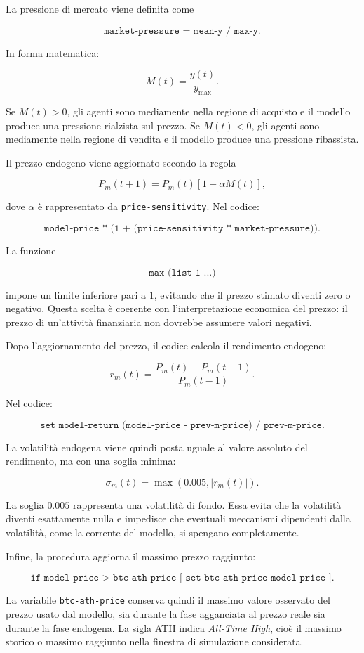 La pressione di mercato viene definita come

\[
\texttt{market-pressure = mean-y / max-y}.
\]

In forma matematica:

\[
M(t)=\frac{\bar{y}(t)}{y_{\max}}.
\]

Se \(M(t)>0\), gli agenti sono mediamente nella regione di acquisto e il modello
produce una pressione rialzista sul prezzo. Se \(M(t)<0\), gli agenti sono
mediamente nella regione di vendita e il modello produce una pressione ribassista.

Il prezzo endogeno viene aggiornato secondo la regola

\[
P_m(t+1)
=
P_m(t)
\left[
1+\alpha M(t)
\right],
\]

dove \(\alpha\) è rappresentato da \texttt{price-sensitivity}. Nel codice:

\[
\texttt{model-price * (1 + (price-sensitivity * market-pressure))}.
\]

La funzione

\[
\texttt{max (list 1 ...)}
\]

impone un limite inferiore pari a \(1\), evitando che il prezzo stimato diventi
zero o negativo. Questa scelta è coerente con l'interpretazione economica del
prezzo: il prezzo di un'attività finanziaria non dovrebbe assumere valori
negativi.

Dopo l'aggiornamento del prezzo, il codice calcola il rendimento endogeno:

\[
r_m(t)=\frac{P_m(t)-P_m(t-1)}{P_m(t-1)}.
\]

Nel codice:

\[
\texttt{set model-return (model-price - prev-m-price) / prev-m-price}.
\]

La volatilità endogena viene quindi posta uguale al valore assoluto del
rendimento, ma con una soglia minima:

\[
\sigma_m(t)=\max(0.005, |r_m(t)|).
\]

La soglia \(0.005\) rappresenta una volatilità di fondo. Essa evita che la
volatilità diventi esattamente nulla e impedisce che eventuali meccanismi
dipendenti dalla volatilità, come la corrente del modello, si spengano
completamente.

Infine, la procedura aggiorna il massimo prezzo raggiunto:

\[
\texttt{if model-price > btc-ath-price [ set btc-ath-price model-price ]}.
\]

La variabile \texttt{btc-ath-price} conserva quindi il massimo valore osservato
del prezzo usato dal modello, sia durante la fase agganciata al prezzo reale sia
durante la fase endogena. La sigla ATH indica \textit{All-Time High}, cioè il
massimo storico o massimo raggiunto nella finestra di simulazione considerata.

